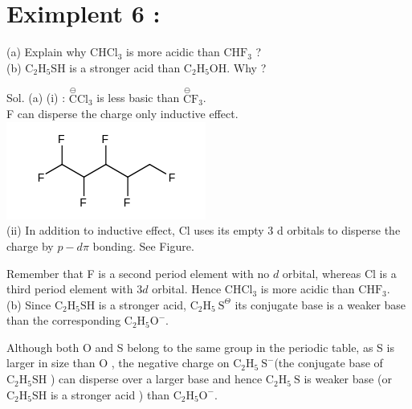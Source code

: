 \documentclass[10pt]{article}
\begin{document}
\section*{Eximplent 6 :}
(a) Explain why $\mathrm{CHCl}_{3}$ is more acidic than $\mathrm{CHF}_{3}$ ?\\
(b) $\mathrm{C}_{2} \mathrm{H}_{5} \mathrm{SH}$ is a stronger acid than $\mathrm{C}_{2} \mathrm{H}_{5} \mathrm{OH}$. Why ?

Sol. (a) (i) : $\stackrel{\ominus}{\mathrm{C}} \mathrm{Cl}_{3}$ is less basic than $\stackrel{\ominus}{\mathrm{C}} \mathrm{F}_{3}$.\\
F can disperse the charge only inductive effect.\\
\includegraphics{smile-9528c4b49722acdd546ae68ab2599f9b999c0b30}\\
(ii) In addition to inductive effect, Cl uses its empty 3 d orbitals to disperse the charge by $p-d \pi$ bonding. See Figure.

Remember that F is a second period element with no $d$ orbital, whereas Cl is a third period element with $3 d$ orbital. Hence $\mathrm{CHCl}_{3}$ is more acidic than $\mathrm{CHF}_{3}$.\\
(b) Since $\mathrm{C}_{2} \mathrm{H}_{5} \mathrm{SH}$ is a stronger acid, $\mathrm{C}_{2} \mathrm{H}_{5} \mathrm{~S}^{\Theta}$ its conjugate base is a weaker base than the corresponding $\mathrm{C}_{2} \mathrm{H}_{5} \mathrm{O}^{-}$.

Although both O and S belong to the same group in the periodic table, as S is larger in size than O , the negative charge on $\mathrm{C}_{2} \mathrm{H}_{5} \mathrm{~S}^{-}$(the conjugate base of $\mathrm{C}_{2} \mathrm{H}_{5} \mathrm{SH}$ ) can disperse over a larger base and hence $\mathrm{C}_{2} \mathrm{H}_{5} \mathrm{~S}$ is weaker base (or $\mathrm{C}_{2} \mathrm{H}_{5} \mathrm{SH}$ is a stronger acid ) than $\mathrm{C}_{2} \mathrm{H}_{5} \mathrm{O}^{-}$.
\end{document}
